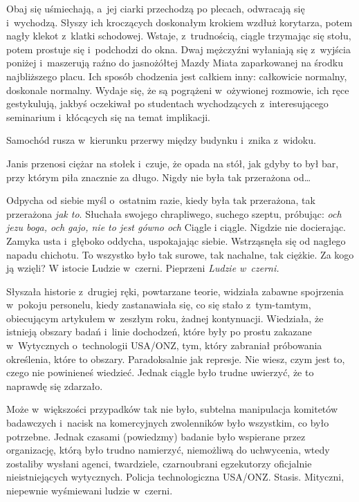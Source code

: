 \documentclass[oneside,polish,11pt,sfheadings]{mwbk}
\begin{document}
Obaj się uśmiechają, a~jej ciarki przechodzą po plecach, odwracają się i~wychodzą. Słyszy ich kroczących doskonałym krokiem wzdłuż korytarza,
potem nagły klekot z~klatki schodowej. Wstaje, z~trudnością, ciągle
trzymając się stołu, potem prostuje się i~podchodzi do okna. Dwaj
mężczyźni wyłaniają się z~wyjścia poniżej i~maszerują raźno do
jasnożółtej Mazdy Miata zaparkowanej na środku najbliższego placu. Ich
sposób chodzenia jest całkiem inny: całkowicie normalny, doskonale
normalny. Wydaje się, że są pogrążeni w~ożywionej rozmowie, ich ręce
gestykulują, jakbyś oczekiwał po studentach wychodzących z~interesującego seminarium i~kłócących się na temat implikacji.

Samochód rusza w~kierunku przerwy między budynku i~znika z~widoku.

Janis przenosi ciężar na stołek i~czuje, że opada na stół, jak gdyby to
był bar, przy którym piła znacznie za długo. Nigdy nie była tak
przerażona od\ldots

Odpycha od siebie myśl o~ostatnim razie, kiedy była tak przerażona, tak
przerażona \emph{jak to}. Słuchała swojego chrapliwego, suchego szeptu,
próbując: \emph{och jezu boga, och gajo, nie to jest gówno och} Ciągle
i ciągle. Nigdzie nie docierając. Zamyka usta i~głęboko oddycha,
uspokajając siebie. Wstrząsnęła się od nagłego napadu chichotu. To
wszystko było tak surowe, tak nachalne, tak ciężkie. Za kogo ją wzięli?
W istocie Ludzie w~czerni. Pieprzeni \emph{Ludzie w~czerni.}

Słyszała historie z~drugiej ręki, powtarzane teorie, widziała zabawne
spojrzenia w~pokoju personelu, kiedy zastanawiała się, co się stało z~tym-tamtym, obiecującym artykułem w~zeszłym roku, żadnej kontynuacji.
Wiedziała, że istnieją obszary badań i~linie dochodzeń, które były po
prostu zakazane w~Wytycznych o~technologii USA/ONZ, tym, który zabraniał
próbowania określenia, które to obszary. Paradoksalnie jak represje. Nie
wiesz, czym jest to, czego nie powinieneś wiedzieć. Jednak ciągle było
trudne uwierzyć, że to naprawdę się zdarzało.

Może w~większości przypadków tak nie było, subtelna manipulacja
komitetów badawczych i~nacisk na komercyjnych zwolenników było
wszystkim, co było potrzebne. Jednak czasami (powiedzmy) badanie było
wspierane przez organizację, którą było trudno namierzyć, niemożliwą do
uchwycenia, wtedy zostaliby wysłani agenci, twardziele, czarnoubrani
egzekutorzy oficjalnie nieistniejących wytycznych. Policja
technologiczna USA/ONZ. Stasis. Mityczni, niepewnie wyśmiewani ludzie w~czerni.
\end{document}
